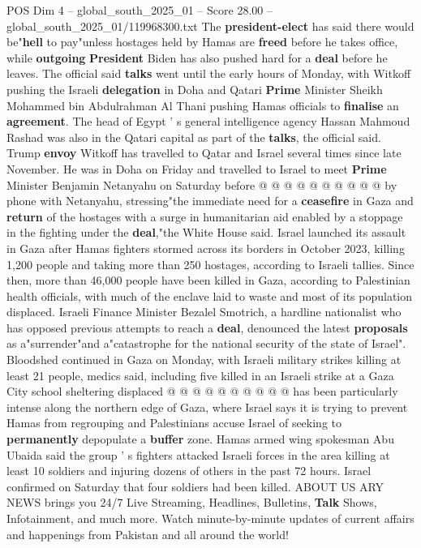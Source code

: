 \begin{textsample}{POS Dim 4 – global\_south\_2025\_01 – Score 28.00 – global\_south\_2025\_01/119968300.txt}
The \textbf{president-elect} has said there would be"\textbf{hell} to pay"unless hostages held by Hamas are \textbf{freed} before he takes office, while \textbf{outgoing} \textbf{President} Biden has also pushed hard for a \textbf{deal} before he leaves.
The official said \textbf{talks} went until the early hours of Monday, with Witkoff pushing the Israeli \textbf{delegation} in Doha and Qatari \textbf{Prime} Minister Sheikh Mohammed bin Abdulrahman Al Thani pushing Hamas officials to \textbf{finalise} an \textbf{agreement}.
The head of Egypt ' s general intelligence agency Hassan Mahmoud Rashad was also in the Qatari capital as part of the \textbf{talks}, the official said.
Trump \textbf{envoy} Witkoff has travelled to Qatar and Israel several times since late November.
He was in Doha on Friday and travelled to Israel to meet \textbf{Prime} Minister Benjamin Netanyahu on Saturday before @ @ @ @ @ @ @ @ @ @ by phone with Netanyahu, stressing"the immediate need for a \textbf{ceasefire} in Gaza and \textbf{return} of the hostages with a surge in humanitarian aid enabled by a stoppage in the fighting under the \textbf{deal},"the White House said.
Israel launched its assault in Gaza after Hamas fighters stormed across its borders in October 2023, killing 1,200 people and taking more than 250 hostages, according to Israeli tallies.
Since then, more than 46,000 people have been killed in Gaza, according to Palestinian health officials, with much of the enclave laid to waste and most of its population displaced.
Israeli Finance Minister Bezalel Smotrich, a hardline nationalist who has opposed previous attempts to reach a \textbf{deal}, denounced the latest \textbf{proposals} as a"surrender"and a"catastrophe for the national security of the state of Israel".
Bloodshed continued in Gaza on Monday, with Israeli military strikes killing at least 21 people, medics said, including five killed in an Israeli strike at a Gaza City school sheltering displaced @ @ @ @ @ @ @ @ @ @ has been particularly intense along the northern edge of Gaza, where Israel says it is trying to prevent Hamas from regrouping and Palestinians accuse Israel of seeking to \textbf{permanently} depopulate a \textbf{buffer} zone.
Hamas armed wing spokesman Abu Ubaida said the group ' s fighters attacked Israeli forces in the area killing at least 10 soldiers and injuring dozens of others in the past 72 hours.
Israel confirmed on Saturday that four soldiers had been killed.
ABOUT US ARY NEWS brings you 24/7 Live Streaming, Headlines, Bulletins, \textbf{Talk} Shows, Infotainment, and much more.
Watch minute-by-minute updates of current affairs and happenings from Pakistan and all around the world!

\end{textsample}
